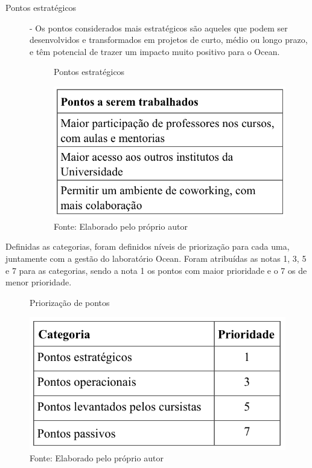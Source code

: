 \begin{description}
\item[Pontos estratégicos] - Os pontos considerados mais estratégicos são aqueles que podem ser desenvolvidos e transformados em projetos de curto, médio ou longo prazo, e têm potencial de trazer um impacto muito positivo para o Ocean.

\begin{figure}[H]
\caption{Pontos estratégicos}
\centerline{\includegraphics[scale=0.75]{img/pontosselecionadosestrategicos}}
\label{fig:pontosselecionadosestrategicos}
\caption* {Fonte: Elaborado pelo próprio autor}
\end{figure}

\end{description}

Definidas as categorias, foram definidos níveis de priorização para cada uma, juntamente com a gestão do laboratório Ocean. Foram atribuídas as notas 1, 3, 5 e 7 para as categorias, sendo a nota 1 os pontos com maior prioridade e o 7 os de menor prioridade.

\begin{figure}[H]
\caption{Priorização de pontos}
\centerline{\includegraphics[scale=0.75]{img/priorizacao}}
\label{fig:priorizacao}
\caption* {Fonte: Elaborado pelo próprio autor}
\end{figure}

